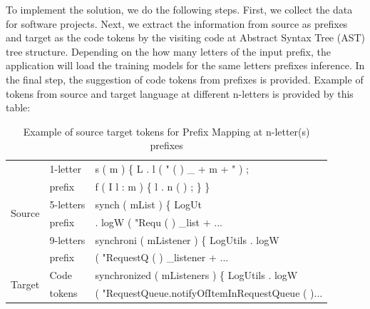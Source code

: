 To implement the solution, we do the following steps. First, we collect the data for software projects. Next, we extract the information from source as prefixes and target as the code tokens by the visiting code at Abstract Syntax Tree (AST) tree structure. Depending on the how many letters of the input prefix, the application will load the training models for the same letters prefixes inference. In the final step, the suggestion of code tokens from prefixes is provided. Example of tokens from source and target language at different n-letters is provided by this table:

\begin{table}[]
\small
\label{tbl001}
\caption{Example of source target tokens for Prefix Mapping at n-letter(s) prefixes }
\begin{tabular}{|l|l|l|}
\hline
\multirow{6}{*}{Source} & 1-letter   & s ( m ) \{ L . l ( " ( ) \_ + m + " ) ;                        \\  
                & prefix  & f ( I l : m ) \{ l . n ( ) ; \} \}                       \\ \cline{2-3} 
                        & 5-letters  & synch ( mList ) \{ LogUt                                         \\  
                        & prefix & . logW ( "Requ ( ) \_list + ...                                          \\ \cline{2-3} 
                        & 9-letters  & synchroni ( mListener ) \{ LogUtils . logW       \\          
                        & prefix & ( "RequestQ ( ) \_listener + ...      \\ \hline
\multirow{2}{*}{Target}                  & Code       & synchronized ( mListeners ) \{ LogUtils . logW  \\
&   tokens   & ( "RequestQueue.notifyOfItemInRequestQueue ( )... \\
\hline
\end{tabular}
\end{table}

\\
\noindent


